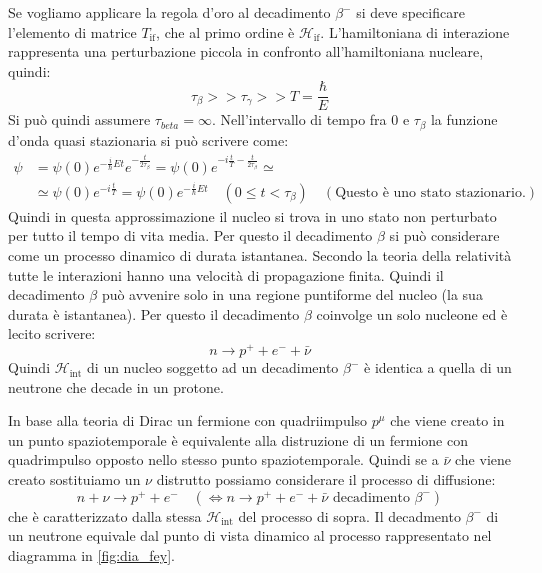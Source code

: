 Se vogliamo applicare la regola d'oro al decadimento $\beta^-$ si deve 
specificare l'elemento di matrice $T_{\text{if}}$, che al primo ordine è 
$\mathcal{H}_{\text{if}}$.
L'hamiltoniana di interazione rappresenta una perturbazione piccola in 
confronto all'hamiltoniana nucleare, quindi:
\[
\tau_{\beta}>>\tau_{\gamma}>>T=\frac{\hbar}{E}
\]
Si può quindi assumere $\tau_{beta}=\infty$. Nell'intervallo di tempo fra $0$ 
e $\tau_{\beta}$ la funzione d'onda quasi stazionaria si può scrivere come:
\[
\begin{split}
\psi 
&=\psi(0)e^{-\frac{i}{\hbar}Et}e^{-\frac{t}{2\tau_{\beta}}}=\psi(0)e^{-i\frac{t}
{T}-\frac{t}{2\tau_{\beta}}}\simeq\\
&\simeq\psi(0)e^{-i\frac{t}{T}}=\psi(0)e^{-\frac{i}{\hbar}Et}\quad(0\leq 
t<\tau_{\beta})\quad(\text{Questo è uno stato stazionario.})
\end{split}
\]
Quindi in questa approssimazione il nucleo si trova in uno stato non perturbato 
per tutto il tempo di vita media. Per questo il decadimento $\beta$ si può 
considerare
come un processo dinamico di durata istantanea. Secondo la teoria della 
relatività tutte le interazioni hanno una velocità di propagazione finita. 
Quindi il decadimento $\beta$
può avvenire solo in una regione puntiforme del nucleo (la sua durata è 
istantanea).
Per questo il decadimento $\beta$ coinvolge un solo nucleone ed è lecito 
scrivere:
\[
n\rightarrow p^++e^-+\bar{\nu}
\]
Quindi $\mathcal{H}_{\text{int}}$ di un nucleo soggetto ad un decadimento 
$\beta^-$ è identica a quella di un neutrone che decade in un protone.
\breaknote

In base alla teoria di Dirac un fermione con 
quadriimpulso $p^{\mu}$ che viene creato in un punto spaziotemporale è 
equivalente alla distruzione di
un fermione con quadrimpulso opposto nello stesso punto spaziotemporale. Quindi 
se a $\bar{\nu}$ che viene creato sostituiamo un $\nu$ distrutto possiamo 
considerare
il processo di diffusione:
\[
n+\nu\rightarrow p^++e^-\quad(\Leftrightarrow n\rightarrow p^++e^-+\bar{\nu} 
\text{ decadimento $\beta^-$})
\]
che è caratterizzato dalla stessa $\mathcal{H}_{\text{int}}$ del processo di 
sopra. Il decadmento $\beta^-$ di un neutrone equivale dal punto di vista 
dinamico al processo rappresentato nel
diagramma in \autoref{fig:dia_fey}.
\begin{figure}
\centering
\caption{}
\label{fig:dia_fey}
\end{figure}

